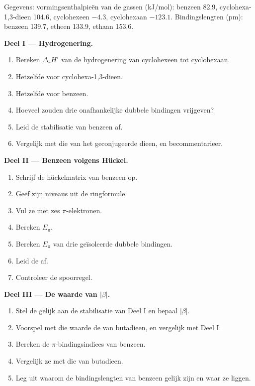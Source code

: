 \begin{problem}
\label{pb:b2:huckel:1}
Gegevens: vormingsenthalpieën van de gassen (\unit{kJ/mol}): benzeen 82.9,
cyclohexa-1,3-dieen 104.6, cyclohexeen $-4.3$, cyclohexaan $-123.1$. Bindingslengten
(pm): benzeen 139.7, etheen 133.9, ethaan 153.6.

\medskip
\noindent\textbf{Deel I --- Hydrogenering.}
\begin{enumerate}
  \item Bereken $\Delta_r H^\circ$ van de hydrogenering van cyclohexeen tot cyclohexaan.
  \item Hetzelfde voor cyclohexa-1,3-dieen.
  \item Hetzelfde voor benzeen.
  \item Hoeveel zouden drie onafhankelijke dubbele bindingen vrijgeven?
  \item Leid de stabilisatie van benzeen af.
  \item Vergelijk met die van het geconjugeerde dieen, en becommentarieer.
\end{enumerate}

\medskip
\noindent\textbf{Deel II --- Benzeen volgens Hückel.}
\begin{enumerate}[resume]
  \item Schrijf de hückelmatrix van benzeen op.
  \item Geef zijn niveaus uit de ringformule.
  \item Vul ze met zes $\pi$-elektronen.
  \item Bereken $E_\pi$.
  \item Bereken $E_\pi$ van drie geïsoleerde dubbele bindingen.
  \item Leid de  af.
  \item Controleer de spoorregel.
\end{enumerate}

\medskip
\noindent\textbf{Deel III --- De waarde van $|\beta|$.}
\begin{enumerate}[resume]
  \item Stel de  gelijk aan de stabilisatie van Deel I en bepaal
        $|\beta|$.
  \item Voorspel met die waarde de  van butadieen, en vergelijk
        met Deel I.
  \item Bereken de $\pi$-bindingsindices van benzeen.
  \item Vergelijk ze met die van butadieen.
  \item Leg uit waarom de bindingslengten van benzeen gelijk zijn en waar ze liggen.
\end{enumerate}


\end{problem}
